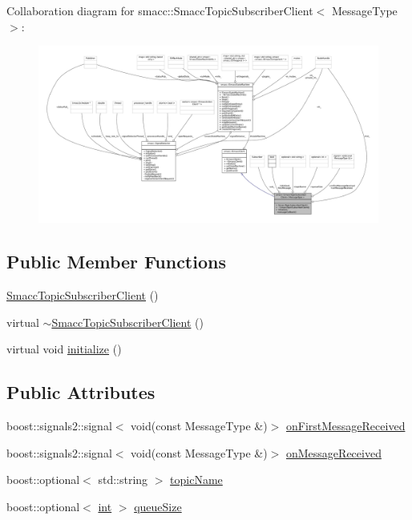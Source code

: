 Collaboration diagram for smacc\+:\+:Smacc\+Topic\+Subscriber\+Client$<$ Message\+Type $>$\+:
\nopagebreak
\begin{figure}[H]
\begin{center}
\leavevmode
\includegraphics[width=350pt]{classsmacc_1_1SmaccTopicSubscriberClient__coll__graph}
\end{center}
\end{figure}
\subsection*{Public Member Functions}
\begin{DoxyCompactItemize}
\item 
\hyperlink{classsmacc_1_1SmaccTopicSubscriberClient_a83128dcfa2531c5778c1f6940e6a190a}{Smacc\+Topic\+Subscriber\+Client} ()
\item 
virtual \hyperlink{classsmacc_1_1SmaccTopicSubscriberClient_afbedb6318483cdb945ce862ec33ab45d}{$\sim$\+Smacc\+Topic\+Subscriber\+Client} ()
\item 
virtual void \hyperlink{classsmacc_1_1SmaccTopicSubscriberClient_af171664e207d6e86da278ea9b0d861ec}{initialize} ()
\end{DoxyCompactItemize}
\subsection*{Public Attributes}
\begin{DoxyCompactItemize}
\item 
boost\+::signals2\+::signal$<$ void(const Message\+Type \&)$>$ \hyperlink{classsmacc_1_1SmaccTopicSubscriberClient_ac18bfc587bbaad6b150ce4bf9cdb56ed}{on\+First\+Message\+Received}
\item 
boost\+::signals2\+::signal$<$ void(const Message\+Type \&)$>$ \hyperlink{classsmacc_1_1SmaccTopicSubscriberClient_a4260d955152200804e9c51a1098965c8}{on\+Message\+Received}
\item 
boost\+::optional$<$ std\+::string $>$ \hyperlink{classsmacc_1_1SmaccTopicSubscriberClient_aa7729f37ea89e5d7ab50c81e84638f60}{topic\+Name}
\item 
boost\+::optional$<$ \hyperlink{classint}{int} $>$ \hyperlink{classsmacc_1_1SmaccTopicSubscriberClient_a1fd2ebc705ae0217ae21b23b7098cd9b}{queue\+Size}
\end{DoxyCompactItemize}

